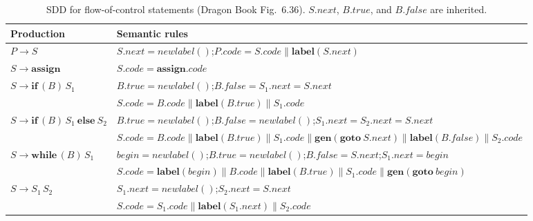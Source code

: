 \documentclass[11pt,a4paper]{article}
\newcommand{\kw}[1]{\textbf{#1}}
\newcommand{\gen}[1]{\ensuremath{\mathbf{gen}(#1)}}
\newcommand{\cc}{\mathbin{\|}}
\newcommand{\at}[2]{\ensuremath{#1.\mathit{#2}}}
\newcommand{\lbl}[1]{\ensuremath{\mathbf{label}(#1)}}
\newcommand{\goto}{\kw{goto}}
\begin{document}
\begin{table}[htbp]
\centering
\small
\begin{tabular}{@{}L{3.6cm} L{11cm}@{}}
\toprule
\textbf{Production} & \textbf{Semantic rules} \\ \midrule
$P \to S$ &
$\at{S}{next}=\mathit{newlabel}()$;\quad $\at{P}{code}=\at{S}{code}\cc\lbl{\at{S}{next}}$ \\[3pt]
$S \to \mathbf{assign}$ &
$\at{S}{code}=\at{\mathbf{assign}}{code}$ \\[3pt]
$S \to \mathbf{if}\,(B)\,S_1$ &
$\at{B}{true}=\mathit{newlabel}()$;\quad $\at{B}{false}=\at{S_1}{next}=\at{S}{next}$\\
& $\at{S}{code}=\at{B}{code}\cc\lbl{\at{B}{true}}\cc\at{S_1}{code}$ \\[3pt]
$S \to \mathbf{if}\,(B)\,S_1\ \mathbf{else}\ S_2$ &
$\at{B}{true}=\mathit{newlabel}()$;\quad $\at{B}{false}=\mathit{newlabel}()$;\quad $\at{S_1}{next}=\at{S_2}{next}=\at{S}{next}$\\
& $\at{S}{code}=\at{B}{code}\cc\lbl{\at{B}{true}}\cc\at{S_1}{code}\cc\gen{\goto\ \at{S}{next}}\cc\lbl{\at{B}{false}}\cc\at{S_2}{code}$ \\[3pt]
$S \to \mathbf{while}\,(B)\,S_1$ &
$\mathit{begin}=\mathit{newlabel}()$;\quad $\at{B}{true}=\mathit{newlabel}()$;\quad $\at{B}{false}=\at{S}{next}$;\quad $\at{S_1}{next}=\mathit{begin}$\\
& $\at{S}{code}=\lbl{\mathit{begin}}\cc\at{B}{code}\cc\lbl{\at{B}{true}}\cc\at{S_1}{code}\cc\gen{\goto\ \mathit{begin}}$ \\[3pt]
$S \to S_1\,S_2$ &
$\at{S_1}{next}=\mathit{newlabel}()$;\quad $\at{S_2}{next}=\at{S}{next}$\\
& $\at{S}{code}=\at{S_1}{code}\cc\lbl{\at{S_1}{next}}\cc\at{S_2}{code}$ \\ \bottomrule
\end{tabular}
\caption{SDD for flow-of-control statements (Dragon Book Fig.~6.36). \at{S}{next}, \at{B}{true}, and \at{B}{false} are inherited.}
\end{table}
\end{document}
